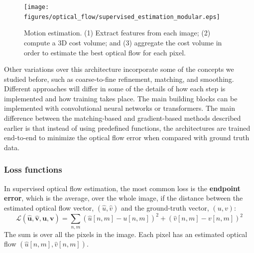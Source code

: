 \vspace{-.2in}
\begin{figure}[h!]
\centerline{
\texttt{[image: figures/optical\_flow/supervised\_estimation\_modular.eps]}}
\caption{Motion estimation. (1) Extract
features from each image;
(2) compute a 3D cost volume;
and (3) aggregate the
cost volume in order to
estimate the best optical
flow for each pixel.
}
\label{fig:supervised_estimation_modular}
\end{figure}

 
 Other variations over this architecture incorporate some of the concepts we studied before, such as coarse-to-fine refinement, matching, and smoothing. Different approaches will differ in some of the details of how each step is implemented and how training takes place. The main building blocks can be implemented with convolutional neural networks or transformers.
The main difference between the matching-based and gradient-based methods described earlier is that instead of using predefined functions, the architectures are trained end-to-end to minimize the optical flow error when compared with ground truth data. 


\subsubsection{Loss functions}
In supervised optical flow estimation, the most common loss is the {\bf endpoint error},
which is the average, over the whole image, if the distance between the estimated optical flow vector, $(\hat{u},\hat{v})$ and the ground-truth vector, $(u,v)$:
\begin{equation}
\mathcal{L} \left( \hat{\mathbf{u}}, \hat{\mathbf{v}}, \mathbf{u}, \mathbf{v} \right) =
\sum_{n,m} (\hat{u}[n,m] - u[n,m])^2 + (\hat{v}[n,m] - v[n,m])^2
\end{equation}
The sum is over all the pixels in the image. Each pixel has an estimated optical flow $(\hat{u}[n,m],\hat{v}[n,m])$.

